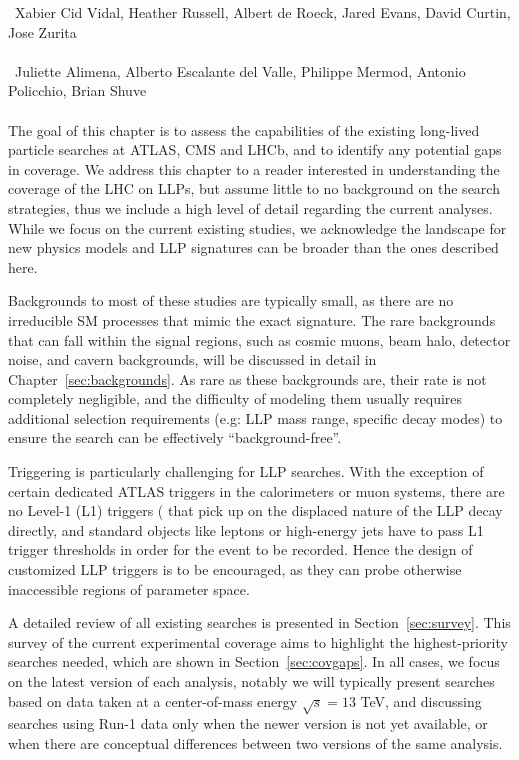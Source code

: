 ~Xabier Cid Vidal, Heather Russell, Albert de Roeck, Jared Evans, David Curtin, Jose Zurita\\
\text{ \; }\\
~Juliette Alimena, Alberto Escalante del Valle, Philippe Mermod, Antonio Policchio, Brian Shuve\\
\text{ \; }\\

\noindent The goal of this chapter is to assess the capabilities of the existing long-lived particle searches at ATLAS, CMS and LHCb, and to identify any potential gaps in coverage.  We address this chapter to a reader interested in understanding the coverage of the LHC on LLPs, but assume little to no background on the search strategies, thus we include a high level of detail regarding the current analyses. While we focus on the current existing studies, we acknowledge the landscape for new physics models and LLP signatures can be broader than the ones described here.

Backgrounds to most of these studies are typically small, as there are no irreducible SM processes that mimic the exact signature.  The rare backgrounds that can fall within the signal regions, such as cosmic muons, beam halo, detector noise, and cavern backgrounds, will be discussed in detail in Chapter~\ref{sec:backgrounds}. As rare as these backgrounds are, their rate is not completely negligible, and the difficulty of modeling them usually requires additional selection requirements (e.g: LLP mass range, specific decay modes) to ensure the search can be effectively ``background-free''. 

Triggering is particularly challenging for LLP searches. With the exception of certain dedicated ATLAS triggers in the calorimeters or muon systems, there are no Level-1 (L1) triggers ( that pick up on the displaced nature of the LLP decay directly, and standard objects like leptons or high-energy jets have to pass L1 trigger thresholds in order for the event to be recorded. Hence the design of customized LLP triggers is to be encouraged, as they can probe otherwise inaccessible regions of parameter space.

A detailed review of all existing searches is presented in Section~\ref{sec:survey}.
This survey of the current experimental coverage aims to highlight the highest-priority searches needed, which are shown in Section~\ref{sec:covgaps}.
In all cases, we focus on the latest version of each analysis, notably we will typically present searches based on data taken at a center-of-mass energy $\sqrt{s}=13$ TeV,  and discussing searches using Run-1 data only when the newer version is not yet available, or when there are conceptual differences between two versions of the same analysis.

